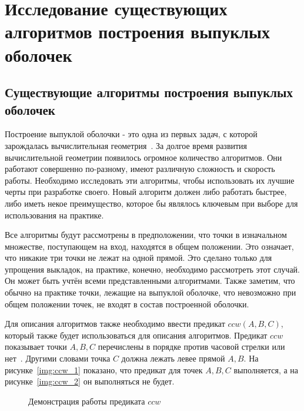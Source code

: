 \chapter{Исследование существующих алгоритмов построения выпуклых оболочек} \label{chapt1}

\section{Существующие алгоритмы построения выпуклых оболочек} \label{sect1_1}

Построение выпуклой оболочки - это одна из первых задач, с которой зарождалась вычислительная геометрия~\cite{chadnov2004algorithmsComparison}. За долгое время развития вычислительной геометрии появилось огромное количество алгоритмов. Они работают совершенно по-разному, имеют различную сложность и скорость работы. Необходимо исследовать эти алгоритмы, чтобы использовать их лучшие черты при разработке своего. Новый алгоритм должен либо работать быстрее, либо иметь некое преимущество, которое бы являлось ключевым при выборе для использования на практике.

Все алгоритмы будут рассмотрены в предположении, что точки в изначальном множестве, поступающем на вход, находятся в общем положении. Это означает, что никакие три точки не лежат на одной прямой. Это сделано только для упрощения выкладок, на практике, конечно, необходимо рассмотреть этот случай. Он может быть учтён всеми представленными алгоритмами. Также заметим, что обычно на практике точки, лежащие на выпуклой оболочке, что невозможно при общем положении точек, не входят в состав построенной оболочки.

Для описания алгоритмов также необходимо ввести предикат $ccw(A, B, C)$, который также будет использоваться для описания алгоритмов. Предикат $ccw$ показывает точки $A, B, C$ перечислены в порядке против часовой стрелки или нет~\cite{pichardie2001formalizing}. Другими словами точка $C$ должна лежать левее прямой $A, B$. На рисунке~\ref{img:ccw_1} показано, что предикат для точек $A, B, C$ выполняется, а на рисунке~\ref{img:ccw_2} он выполняться не будет.

\begin{figure}[H]
	{\centering
		\hfill
		\subbottom[\label{img:ccw_1}]{%
			}
		\hfill
		\subbottom[\label{img:ccw_2}]{%
			}
		\hfill
	}
	\caption{Демонстрация работы предиката $ccw$}
	\label{img:ccw}
\end{figure}


